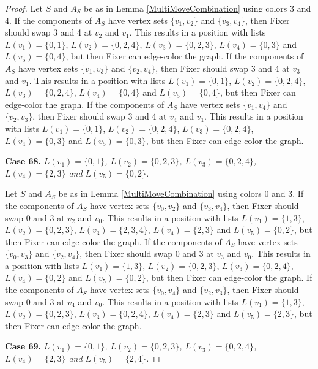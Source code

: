 \documentclass[12pt]{amsart}
\theoremstyle{plain}
\theoremstyle{definition}
\theoremstyle{remark}
\begin{document}
\begin{proof}
Let $S$ and $A_S$ be as in Lemma \ref{MultiMoveCombination} using colors $3$ and $4$. If the components of $A_S$ have vertex sets $\{v_1, v_2\}$ and $\{v_3, v_4\}$, then Fixer should swap 3 and 4 at $v_2$ and $v_1$. This results in a position with lists $L(v_1) = \{0, 1\}$, $L(v_2) = \{0, 2, 4\}$, $L(v_3) = \{0, 2, 3\}$, $L(v_4) = \{0, 3\}$ and $L(v_5) = \{0, 4\}$, but then Fixer can edge-color the graph.
If the components of $A_S$ have vertex sets $\{v_1, v_3\}$ and $\{v_2, v_4\}$, then Fixer should swap 3 and 4 at $v_3$ and $v_1$. This results in a position with lists $L(v_1) = \{0, 1\}$, $L(v_2) = \{0, 2, 4\}$, $L(v_3) = \{0, 2, 4\}$, $L(v_4) = \{0, 4\}$ and $L(v_5) = \{0, 4\}$, but then Fixer can edge-color the graph.
If the components of $A_S$ have vertex sets $\{v_1, v_4\}$ and $\{v_2, v_3\}$, then Fixer should swap 3 and 4 at $v_4$ and $v_1$. This results in a position with lists $L(v_1) = \{0, 1\}$, $L(v_2) = \{0, 2, 4\}$, $L(v_3) = \{0, 2, 4\}$, $L(v_4) = \{0, 3\}$ and $L(v_5) = \{0, 3\}$, but then Fixer can edge-color the graph.

\noindent\textbf{Case 68.  }\textit{$L(v_1) = \{0, 1\}$, $L(v_2) = \{0, 2, 3\}$, $L(v_3) = \{0, 2, 4\}$, $L(v_4) = \{2, 3\}$ and $L(v_5) = \{0, 2\}$.}

Let $S$ and $A_S$ be as in Lemma \ref{MultiMoveCombination} using colors $0$ and $3$. If the components of $A_S$ have vertex sets $\{v_0, v_2\}$ and $\{v_3, v_4\}$, then Fixer should swap 0 and 3 at $v_2$ and $v_0$. This results in a position with lists $L(v_1) = \{1, 3\}$, $L(v_2) = \{0, 2, 3\}$, $L(v_3) = \{2, 3, 4\}$, $L(v_4) = \{2, 3\}$ and $L(v_5) = \{0, 2\}$, but then Fixer can edge-color the graph.
If the components of $A_S$ have vertex sets $\{v_0, v_3\}$ and $\{v_2, v_4\}$, then Fixer should swap 0 and 3 at $v_3$ and $v_0$. This results in a position with lists $L(v_1) = \{1, 3\}$, $L(v_2) = \{0, 2, 3\}$, $L(v_3) = \{0, 2, 4\}$, $L(v_4) = \{0, 2\}$ and $L(v_5) = \{0, 2\}$, but then Fixer can edge-color the graph.
If the components of $A_S$ have vertex sets $\{v_0, v_4\}$ and $\{v_2, v_3\}$, then Fixer should swap 0 and 3 at $v_4$ and $v_0$. This results in a position with lists $L(v_1) = \{1, 3\}$, $L(v_2) = \{0, 2, 3\}$, $L(v_3) = \{0, 2, 4\}$, $L(v_4) = \{2, 3\}$ and $L(v_5) = \{2, 3\}$, but then Fixer can edge-color the graph.

\noindent\textbf{Case 69.  }\textit{$L(v_1) = \{0, 1\}$, $L(v_2) = \{0, 2, 3\}$, $L(v_3) = \{0, 2, 4\}$, $L(v_4) = \{2, 3\}$ and $L(v_5) = \{2, 4\}$.}


\end{proof}
\end{document}
